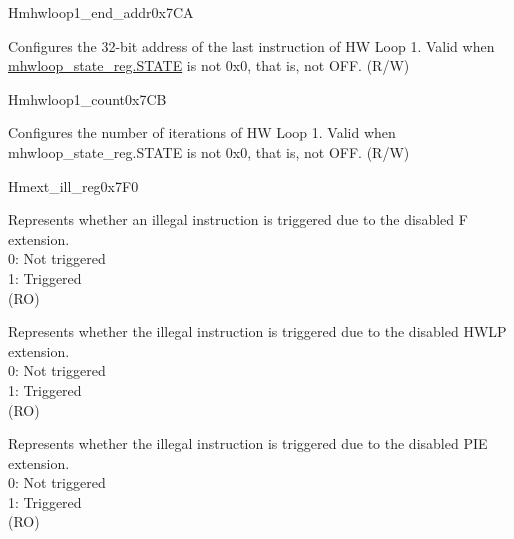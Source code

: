 \begin{register}{H}{mhwloop1\_end\_addr}{0x7CA}\label{regdesc:mhloop1_end_addr}
%
\regnewline%
\begin{regdesc}\begin{reglist}
\label{fielddesc:HWLP1_EA}\item [EA] Configures the 32-bit address of the last instruction of HW Loop 1. Valid when \hyperref[fielddesc:HWSTATE]{mhwloop\_state\_reg.STATE} is not 0x0, that is, not OFF. (R/W)
\end{reglist}\end{regdesc}
\end{register}

\begin{register}{H}{mhwloop1\_count}{0x7CB}\label{regdesc:mhloop1_count}
%
%
\regnewline%
\begin{regdesc}\begin{reglist}
\label{fielddesc:MHLP1_COUNT}\item [COUNT] Configures the number of iterations of HW Loop 1. Valid when mhwloop\_state\_reg.STATE is not 0x0, that is, not OFF. (R/W)
\end{reglist}\end{regdesc}
\end{register}

\begin{register}{H}{mext\_ill\_reg}{0x7F0}\label{regdesc:mext_ill_reg}
%
%
%
%
\regnewline%
\begin{regdesc}\begin{reglist}
\label{fielddesc:ILL_FPU}\item [ILL\_FPU] Represents whether an illegal instruction is triggered due to the disabled F extension.\\ 
0: Not triggered\\
1: Triggered\\
(RO)
\label{fielddesc:ILL_HWL}\item [ILL\_HWL] Represents whether the illegal instruction is triggered due to the disabled HWLP extension. \\ 
0: Not triggered\\
1: Triggered\\
(RO)
\label{fielddesc:ILL_PIE}\item [ILL\_PIE] Represents whether the illegal instruction is triggered due to the disabled PIE extension. \\ 
0: Not triggered\\
1: Triggered\\
(RO)
\end{reglist}\end{regdesc}
\end{register}

